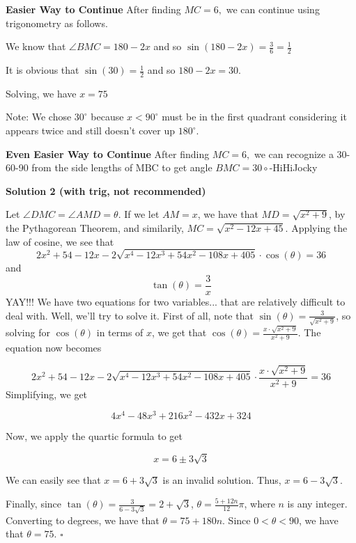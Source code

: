 \begin{enumerate}
 \textbf{Easier Way to Continue} After finding $MC = 6,$ we can continue using trigonometry as follows. 

 We know that $\angle{BMC} = 180-2x$ and so $\sin (180-2x) = \frac{3}{6} = \frac{1}{2}$

 It is obvious that $\sin (30) = \frac{1}{2}$ and so $180-2x=30.$

 Solving, we have $x = \boxed{75}$

 Note: We chose $30^\circ$ because $x < 90^\circ$ must be in the first quadrant considering it appears twice and still doesn't cover up $180^\circ$.

 \textbf{Even Easier Way to Continue} After finding $MC = 6,$ we can recognize a 30-60-90 from the side lengths of MBC to get angle $BMC = 30\circ$-HiHiJocky

 



\textbf{Solution 2 (with trig, not recommended)}

Let $\angle{DMC} = \angle{AMD} = \theta$. If we let $AM = x$, we have that $MD = \sqrt{x^2 + 9}$, by the Pythagorean Theorem, and similarily, $MC = \sqrt{x^2 - 12x + 45}$. Applying the law of cosine, we see that 
 \[2x^2 + 54 - 12x - 2 \sqrt{x^4 - 12x^3 + 54x^2 - 108x + 405} \cdot \cos (\theta) = 36\] and 
 \[\tan (\theta) = \frac{3}{x}\] YAY!!! We have two equations for two variables... that are relatively difficult to deal with. Well, we'll try to solve it. First of all, note that $\sin (\theta) = \frac{3}{\sqrt{x^2+9}}$, so solving for $\cos (\theta)$ in terms of $x$, we get that $\cos (\theta) = \frac{x \cdot \sqrt{x^2 + 9}}{x^2 + 9}$. The equation now becomes 

 
 \[2x^2 + 54 - 12x - 2 \sqrt{x^4 - 12x^3 + 54x^2 - 108x + 405} \cdot \frac{x \cdot \sqrt{x^2 + 9}}{x^2 + 9} = 36\]Simplifying, we get

 
 \[4x^4 - 48x^3 + 216x^2 - 432x + 324\]

 Now, we apply the quartic formula to get 

 
 \[x = 6 \pm 3 \sqrt{3}\]

 We can easily see that $x = 6 + 3 \sqrt{3}$ is an invalid solution. Thus, $x = 6 - 3 \sqrt{3}$. 

 Finally, since $\tan (\theta) = \frac{3}{6 - 3 \sqrt{3}} = 2 + \sqrt{3}$, $\theta = \frac{5 + 12n}{12} \pi$, where $n$ is any integer. Converting to degrees, we have that $\theta = 75 + 180n$. Since $0 < \theta < 90$, we have that $\theta = \boxed{75}$. $\square$





\end{enumerate}
